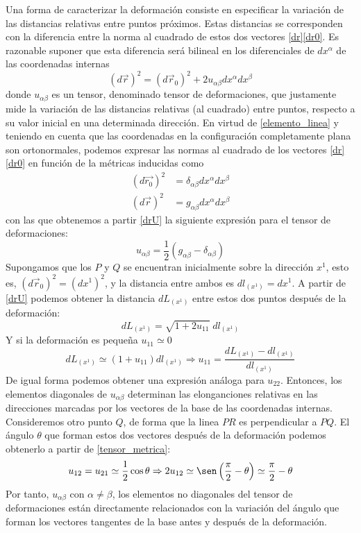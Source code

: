 Una forma de caracterizar la deformación consiste en especificar la variación
de las distancias relativas entre puntos próximos. Estas distancias se
corresponden con la diferencia entre la norma al cuadrado de estos dos vectores
\eqref{dr}\eqref{dr0}. Es razonable suponer que esta diferencia será bilineal
en los diferenciales de $dx^{\alpha}$ de las coordenadas internas 
\begin{equation}\label{drU}
(d\vec{r})^2=(d\vec{r}_0)^2+2u_{\alpha\beta}dx^{\alpha}dx^{\beta}
\end{equation}
donde $u_{\alpha\beta}$ es un tensor, denominado tensor de deformaciones, que justamente mide
la variación de las distancias relativas (al cuadrado) entre puntos, respecto a su valor
inicial en una determinada dirección. En virtud de \eqref{elemento_linea} y
teniendo en cuenta que las coordenadas en la configuración completamente plana
son ortonormales, podemos expresar las normas al cuadrado de los vectores
\eqref{dr}\eqref{dr0} en función de la métricas inducidas como
\begin{align}
(d\vec{r_0})^2&=\delta_{\alpha\beta}dx^{\alpha}dx^{\beta}\label{Meuclidea}\\
(d\vec{r})^2&=g_{\alpha\beta}dx^{\alpha}dx^{\beta}
\end{align}
con las que obtenemos a partir \eqref{drU} la siguiente expresión para el
tensor de deformaciones:
\begin{equation}\label{tensor_metrica}
u_{\alpha\beta}=\frac{1}{2}\left(g_{\alpha\beta} - \delta_{\alpha\beta}\right)
\end{equation}
 Supongamos que los $P$ y $Q$ se encuentran
inicialmente sobre la dirección $x^1$, esto es, $(d\vec{r}_0)^2=(dx^1)^2$, y
la distancia entre ambos es $dl_{(x^1)}=dx^1$. A
partir de \eqref{drU} podemos obtener la distancia $dL_{(x^1)}$ entre estos
dos puntos después de la deformación:
\begin{equation*}
dL_{(x^1)}=\sqrt{1+2u_{11}}\;dl_{(x^1)}
\end{equation*}
Y si la deformación es pequeña $u_{11}\simeq 0$
\begin{equation*}
dL_{(x^1)}\simeq (1+u_{11}) dl_{(x^1)} \Rightarrow u_{11}=\frac{dL_{(x^1)}-dl_{(x^1)}}{dl_{(x^1)}}
\end{equation*}
De igual forma podemos obtener una expresión análoga para $u_{22}$. Entonces,
los elementos diagonales de $u_{\alpha\beta}$ determinan las elonganciones
relativas en las direcciones marcadas por los vectores de la base de las
coordenadas internas. Consideremos otro punto $Q$, de forma que la linea $PR$
es perpendicular a $PQ$. El ángulo $\theta$ que forman estos dos vectores
después de la deformación podemos obtenerlo a partir de
\eqref{tensor_metrica}:
\begin{equation}
u_{12}=u_{21}\simeq \frac{1}{2}\cos \theta \Rightarrow 2u_{12}\simeq\sen \left(\frac{\pi}{2}-\theta\right)\simeq \frac{\pi}{2}-\theta
\end{equation}
Por tanto, $u_{\alpha\beta}$ con $\alpha\neq\beta$, los elementos no
diagonales del tensor de deformaciones están directamente relacionados con la
variación del ángulo que forman los vectores tangentes de la base antes y
después de la deformación.

